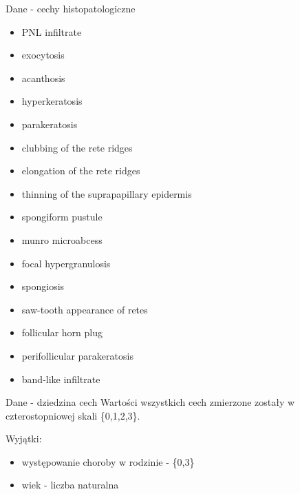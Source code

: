 \documentclass{beamer}
\begin{document}
\begin{frame}{Dane - cechy histopatologiczne}
\begin{itemize}
\item PNL infiltrate
\item exocytosis
\item acanthosis
\item hyperkeratosis
\item parakeratosis
\item clubbing of the rete ridges
\item elongation of the rete ridges
\item thinning of the suprapapillary epidermis
\item spongiform pustule
\item munro microabcess
\item focal hypergranulosis
\item spongiosis
\item saw-tooth appearance of retes
\item follicular horn plug
\item perifollicular parakeratosis
\item band-like infiltrate
\end{itemize}
\end{frame}

\begin{frame}{Dane - dziedzina cech}
Wartości wszystkich cech zmierzone zostały w czterostopniowej skali \{0,1,2,3\}.

\vspace{0.5cm}

Wyjątki:
\begin{itemize}
\item występowanie choroby w rodzinie - \{0,3\}
\item wiek - liczba naturalna
\end{itemize}

\end{frame}
\end{document}
